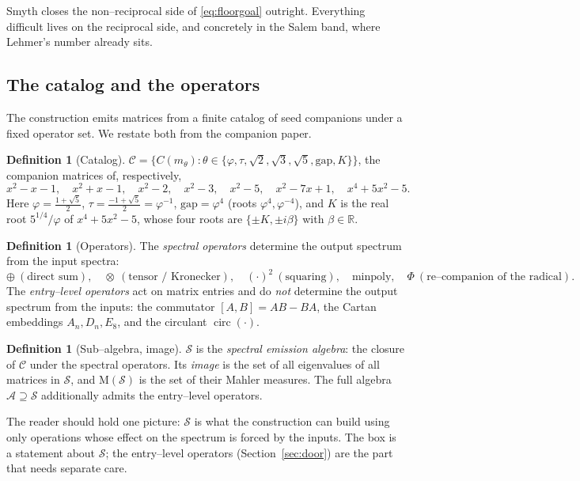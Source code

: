 \documentclass[11pt]{article}
\theoremstyle{plain}
\theoremstyle{definition}
\newtheorem{definition}[theorem]{Definition}
\theoremstyle{remark}
\newcommand{\R}{\mathbb{R}}
\newcommand{\Mah}{\mathrm{M}}
\newcommand{\Scal}{\mathcal{S}}
\newcommand{\Acal}{\mathcal{A}}
\newcommand{\Ccal}{\mathcal{C}}
\begin{document}
Smyth closes the non--reciprocal side of \eqref{eq:floorgoal} outright. Everything difficult lives on the reciprocal side, and concretely in the Salem band, where Lehmer's number already sits.

\subsection{The catalog and the operators}\label{sec:catalog}
The construction emits matrices from a finite catalog of seed companions under a fixed operator set. We restate both from the companion paper.

\begin{definition}[Catalog]\label{def:catalog}
$\Ccal=\{C(m_\theta):\theta\in\{\varphi,\tau,\sqrt2,\sqrt3,\sqrt5,\mathrm{gap},K\}\}$, the companion matrices of, respectively,
\[
x^2-x-1,\quad x^2+x-1,\quad x^2-2,\quad x^2-3,\quad x^2-5,\quad x^2-7x+1,\quad x^4+5x^2-5 .
\]
Here $\varphi=\tfrac{1+\sqrt5}2$, $\tau=\tfrac{-1+\sqrt5}2=\varphi^{-1}$, $\mathrm{gap}=\varphi^4$ (roots $\varphi^{4},\varphi^{-4}$), and $K$ is the real root $5^{1/4}/\varphi$ of $x^4+5x^2-5$, whose four roots are $\{\pm K,\pm i\beta\}$ with $\beta\in\R$.
\end{definition}

\begin{definition}[Operators]\label{def:ops}
The \emph{spectral operators} determine the output spectrum from the input spectra:
\[
\oplus\ (\text{direct sum}),\quad \otimes\ (\text{tensor / Kronecker}),\quad (\cdot)^2\ (\text{squaring}),\quad \text{minpoly},\quad \Phi\ (\text{re--companion of the radical}).
\]
The \emph{entry--level operators} act on matrix entries and do \emph{not} determine the output spectrum from the inputs: the commutator $[A,B]=AB-BA$, the Cartan embeddings $A_n,D_n,E_8$, and the circulant $\operatorname{circ}(\cdot)$.
\end{definition}

\begin{definition}[Sub--algebra, image]\label{def:image}
$\Scal$ is the \emph{spectral emission algebra}: the closure of $\Ccal$ under the spectral operators. Its \emph{image} is the set of all eigenvalues of all matrices in $\Scal$, and $\Mah(\Scal)$ is the set of their Mahler measures. The full algebra $\Acal\supseteq\Scal$ additionally admits the entry--level operators.
\end{definition}

The reader should hold one picture: $\Scal$ is what the construction can build using only operations whose effect on the spectrum is forced by the inputs. The box is a statement about $\Scal$; the entry--level operators (Section~\ref{sec:door}) are the part that needs separate care.
\end{document}

